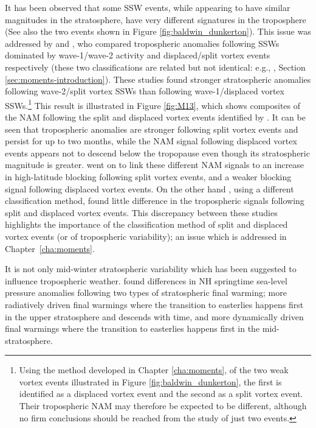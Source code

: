 It has been observed that some SSW events, while appearing to have similar
magnitudes in the stratosphere, have very different signatures in the
troposphere \citep[e.g.,][]{Baldwin2001a,Tomassini2012} (See also the two events
shown in Figure \ref{fig:baldwin_dunkerton}). This issue was addressed by
\citet{Nakagawa2006} and \citet{Mitchell2013}, who compared tropospheric
anomalies following SSWs dominated by wave-1/wave-2 activity and displaced/split
vortex events respectively (these two classifications are related but not
identical: e.g., \citet{Waugh1997}, Section
\ref{sec:moments-introduction}). These studies found stronger stratospheric
anomalies following wave-2/split vortex SSWs than following wave-1/displaced
vortex SSWs.\footnote{Using the method developed in Chapter \ref{cha:moments},
  of the two weak vortex events illustrated in Figure
  \ref{fig:baldwin_dunkerton}, the first is identified as a displaced vortex
  event and the second as a split vortex event. Their tropospheric NAM may
  therefore be expected to be different, although no firm conclusions should be
  reached from the study of just two events.} This result is illustrated in
Figure \ref{fig:M13}, which shows composites of the NAM following the split and
displaced vortex events identified by \citet{Mitchell2013}. It can be seen that
tropospheric anomalies are stronger following split vortex events and persist
for up to two months, while the NAM signal following displaced vortex events
appears not to descend below the tropopause even though its stratospheric
magnitude is greater. \citet{Mitchell2013} went on to link these different NAM
signals to an increase in high-latitude blocking following split vortex events,
and a weaker blocking signal following displaced vortex events. On the other
hand \citet{Charlton2007}, using a different classification method, found little
difference in the tropospheric signals following split and displaced vortex
events. This discrepancy between these studies highlights the importance of the
classification method of split and displaced vortex events (or of tropospheric
variability); an issue which is addressed in Chapter~\ref{cha:moments}.

It is not only mid-winter stratospheric variability which has been suggested to
influence tropospheric weather. \citet{Hardiman2011} found differences
in NH springtime sea-level pressure anomalies following two types of
stratospheric final warming; more radiatively driven final warmings where the
transition to easterlies happens first in the upper stratosphere and descends
with time, and more dynamically driven final warmings where the transition to
easterlies happens first in the mid-stratosphere.  

